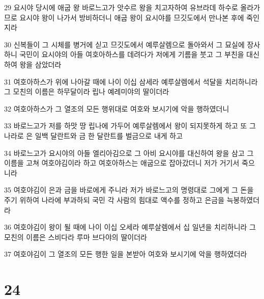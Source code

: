 \par 29 요시야 당시에 애굽 왕 바로느고가 앗수르 왕을 치고자하여 유브라데 하수로 올라가므로 요시야 왕이 나가서 방비하더니 애굽 왕이 요시야를 므깃도에서 만나본 후에 죽인지라
\par 30 신복들이 그 시체를 병거에 싣고 므깃도에서 예루살렘으로 돌아와서 그 묘실에 장사하니 국민이 요시야의 아들 여호아하스를 데려다가 저에게 기름을 붓고 그 부친을 대신하여 왕을 삼았더라
\par 31 여호아하스가 위에 나아갈 때에 나이 이십 삼세라 예루살렘에서 석달을 치리하니라 그 모친의 이름은 하무달이라 립나 예레미야의 딸이더라
\par 32 여호아하스가 그 열조의 모든 행위대로 여호와 보시기에 악을 행하였더니
\par 33 바로느고가 저를 하맛 땅 립나에 가두어 예루살렘에서 왕이 되지못하게 하고 또 그 나라로 은 일백 달란트와 금 한 달란트를 벌금으로 내게 하고
\par 34 바로느고가 요시야의 아들 엘리아김으로 그 아비 요시야를 대신하여 왕을 삼고 그 이름을 고쳐 여호야김이라 하고 여호아하스는 애굽으로 잡아갔더니 저가 거기서 죽으니라
\par 35 여호야김이 은과 금을 바로에게 주니라 저가 바로느고의 명령대로 그에게 그 돈을 주기 위하여 나라에 부과하되 국민 각 사람의 힘대로 액수를 정하고 은금을 늑봉하였더라
\par 36 여호야김이 왕이 될 때에 나이 이십 오세라 예루살렘에서 십 일년을 치리하니라 그 모친의 이름은 스비다라 루마 브다야의 딸이더라
\par 37 여호야김이 그 열조의 모든 행한 일을 본받아 여호와 보시기에 악을 행하였더라

\chapter{24}

